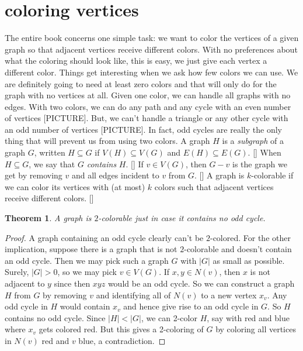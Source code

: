 \documentclass{amsbook}
\newcommand{\aaside}[2]{\marginnote{\scriptsize{#1}}[#2]}
\theoremstyle{plain}
\newtheorem{theorem}{Theorem}
\numberwithin{equation}{chapter}
\newcommand{\card}[1]{\left|#1\right|}
\begin{document}
\chapter*{coloring vertices}
The entire book concerns one simple task: we want to color the vertices of a given graph so that adjacent vertices receive different colors.
With no preferences about what the coloring should look like, this is easy, we just give each vertex a different color.  Things get
interesting when we ask how few colors we can use.  We are definitely going to need at least zero colors and that will only do for the
graph with no vertices at all.  Given one color, we can handle all graphs with no edges.  With two colors, we can do
any path and any cycle with an even number of vertices [PICTURE].  But, we can't handle a triangle or any other cycle with an odd number of vertices [PICTURE].
In fact, odd cycles are really the only thing that will prevent us from using two colors. 
A graph $H$ is a \emph{subgraph} of a graph $G$, written $H \subseteq G$ if $V(H) \subseteq V(G)$ and $E(H) \subseteq E(G)$. \aaside{subgraph, $\subseteq$}{}
When $H \subseteq G$, we say that $G$ \emph{contains} $H$. \aaside{contains}{}  If $v \in V(G)$, then $G-v$ is the graph we get by removing $v$ and all edges incident to $v$ from $G$. \aaside{$G-v$}{}
A graph is $k$-colorable if we can color its vertices with (at most) $k$ colors such that adjacent vertices receive different colors. \aaside{$k$-colorable}{}
\begin{theorem}
A graph is $2$-colorable just in case it contains no odd cycle.
\end{theorem}
\begin{proof}
A graph containing an odd cycle clearly can't be $2$-colored.  For the other implication, suppose
there is a graph that is not $2$-colorable and doesn't contain an odd cycle.  Then we may pick such a graph $G$ with $\card{G}$ as small as possible.
Surely, $|G| > 0$, so we may pick $v \in V(G)$.  If $x, y \in N(v)$, then $x$ is not adjacent to $y$ since then $xyz$ would be an odd cycle.
So we can construct a graph $H$ from $G$ by removing $v$ and identifying all of $N(v)$ to a new vertex $x_v$.  Any odd cycle
in $H$ would contain $x_v$ and hence give rise to an odd cycle in $G$.  So $H$ contains no odd cycle. Since $|H| < |G|$, we can 2-color $H$, say with red and blue
where $x_v$ gets colored red.  But this gives a 2-coloring of $G$ by coloring all vertices in $N(v)$ red and $v$ blue, a contradiction.
\end{proof}
\end{document}

